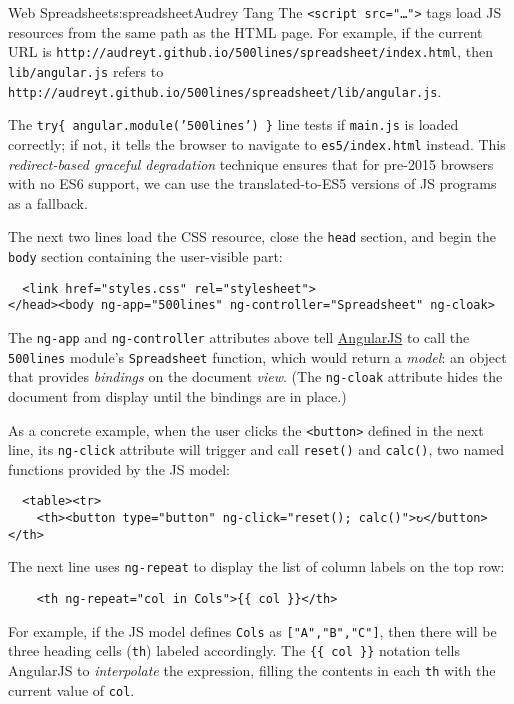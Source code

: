 \begin{aosachapter}{Web Spreadsheet}{s:spreadsheet}{Audrey Tang}
The \texttt{\textless{}script src="\ldots{}"\textgreater{}} tags load JS
resources from the same path as the HTML page. For example, if the
current URL is
\texttt{http://audreyt.github.io/500lines/spreadsheet/index.html}, then
\texttt{lib/angular.js} refers to
\texttt{http://audreyt.github.io/500lines/spreadsheet/lib/angular.js}.

The \texttt{try\{ angular.module('500lines') \}} line tests if
\texttt{main.js} is loaded correctly; if not, it tells the browser to
navigate to \texttt{es5/index.html} instead. This \emph{redirect-based
graceful degradation} technique ensures that for pre-2015 browsers with
no ES6 support, we can use the translated-to-ES5 versions of JS programs
as a fallback.

The next two lines load the CSS resource, close the \texttt{head}
section, and begin the \texttt{body} section containing the user-visible
part:

\begin{verbatim}
  <link href="styles.css" rel="stylesheet">
</head><body ng-app="500lines" ng-controller="Spreadsheet" ng-cloak>
\end{verbatim}

The \texttt{ng-app} and \texttt{ng-controller} attributes above tell
\href{http://angularjs.org/}{AngularJS} to call the \texttt{500lines}
module's \texttt{Spreadsheet} function, which would return a
\emph{model}: an object that provides \emph{bindings} on the document
\emph{view}. (The \texttt{ng-cloak} attribute hides the document from
display until the bindings are in place.)

As a concrete example, when the user clicks the
\texttt{\textless{}button\textgreater{}} defined in the next line, its
\texttt{ng-click} attribute will trigger and call \texttt{reset()} and
\texttt{calc()}, two named functions provided by the JS model:

\begin{verbatim}
  <table><tr>
    <th><button type="button" ng-click="reset(); calc()">↻</button></th>
\end{verbatim}

The next line uses \texttt{ng-repeat} to display the list of column
labels on the top row:

\begin{verbatim}
    <th ng-repeat="col in Cols">{{ col }}</th>
\end{verbatim}

For example, if the JS model defines \texttt{Cols} as
\texttt{{[}"A","B","C"{]}}, then there will be three heading cells
(\texttt{th}) labeled accordingly. The \texttt{\{\{ col \}\}} notation
tells AngularJS to \emph{interpolate} the expression, filling the
contents in each \texttt{th} with the current value of \texttt{col}.


\end{aosachapter}
